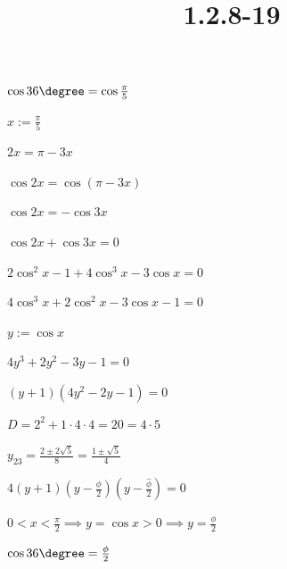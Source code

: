 \documentclass{article}
\title{1.2.8-19}
\begin{document}
\maketitle

\( \cos 36\degree = \cos\frac{\pi}{5} \)

\( x := \frac{\pi}{5} \)

\( 2x = \pi - 3x \)

\( \cos{2x} = \cos(\pi - 3x) \)

\( \cos{2x} = -\cos{3x} \)

\( \cos{2x} + \cos{3x} = 0 \)

\( 2\cos^2x - 1 + 4\cos^3x-3\cos x = 0 \)

\( 4\cos^3x+2\cos^2x-3\cos x-1=0 \)

\( y := \cos x \)

\( 4y^3+2y^2-3y-1=0 \)

\( (y+1)(4y^2-2y-1)=0 \)

\( D = 2^2+1\cdot4\cdot 4=20=4\cdot5 \)

\( y_{23}=\frac{2\pm 2\sqrt{5}}{8} = \frac{1\pm\sqrt{5}}{4} \)

\( 4(y+1)(y-\frac{\phi}{2})(y-\frac{\hat\phi}{2}) = 0 \)

\( 0 < x < \frac{\pi}{2} \implies y = \cos x > 0 \implies y = \frac{\phi}{2} \)

\( \cos 36\degree = \frac{\phi}{2} \)
\end{document}
